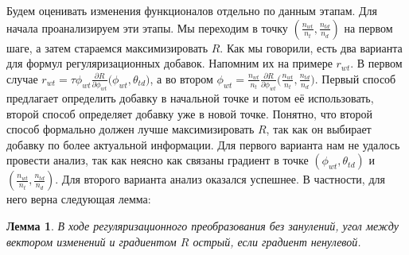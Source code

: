 \documentclass[12pt]{article}
\newtheorem{lemma}[remark]{Лемма}
\begin{document}
Будем оценивать изменения функционалов отдельно по данным этапам. Для начала проанализируем эти этапы. Мы переходим в точку $(\frac{n_{wt}}{n_t}, \frac{n_{td}}{n_d})$ на первом шаге, а затем стараемся максимизировать $R$. Как мы говорили, есть два варианта для формул регуляризационных добавок. Напомним их на примере $r_{wt}$. В первом случае $r_{wt} = \tau\phi_{wt} \frac{\partial{R}}{\partial{\phi_{wt}}} \big( \phi_{wt}, \theta_{td}\big)$, а во втором $\phi_{wt} = \frac{n_{wt}}{n_t} \frac{\partial{R}}{\partial{\phi_{wt}}} \big(\frac{n_{wt}}{n_t}, \frac{n_{td}}{n_d}\big)$. Первый способ предлагает определить добавку в начальной точке и потом её использовать, второй способ определяет добавку уже в новой точке. Понятно, что второй способ формально должен лучше максимизировать $R$, так как он выбирает добавку по более актуальной информации. Для первого варианта нам не удалось провести анализ, так как неясно как связаны градиент в точке $(\phi_{wt}, \theta_{td})$ и $(\frac{n_{wt}}{n_t}, \frac{n_{td}}{n_d})$. Для второго варианта анализ оказался успешнее. В частности, для него верна следующая лемма:
\begin{lemma}           
 В ходе регуляризационного преобразования  без занулений, угол  между вектором изменений и градиентом $R$ острый, если градиент ненулевой.
\end{lemma}
\end{document}
